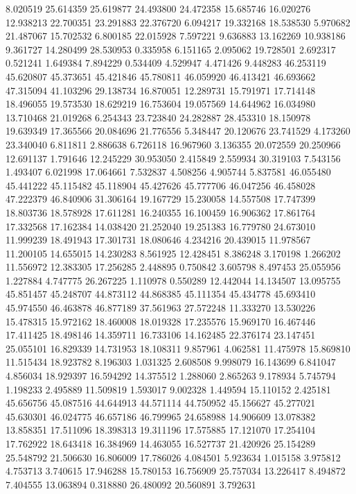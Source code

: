 8.020519
25.614359
25.619877
24.493800
24.472358
15.685746
16.020276
12.938213
22.700351
23.291883
22.376720
6.094217
19.332168
18.538530
5.970682
21.487067
15.702532
6.800185
22.015928
7.597221
9.636883
13.162269
10.938186
9.361727
14.280499
28.530953
0.335958
6.151165
2.095062
19.728501
2.692317
0.521241
1.649384
7.894229
0.534409
4.529947
4.471426
9.448283
46.253119
45.620807
45.373651
45.421846
45.780811
46.059920
46.413421
46.693662
47.315094
41.103296
29.138734
16.870051
12.289731
15.791971
17.714148
18.496055
19.573530
18.629219
16.753604
19.057569
14.644962
16.034980
13.710468
21.019268
6.254343
23.723840
24.282887
28.453310
18.150978
19.639349
17.365566
20.084696
21.776556
5.348447
20.120676
23.741529
4.173260
23.340040
6.811811
2.886638
6.726118
16.967960
3.136355
20.072559
20.250966
12.691137
1.791646
12.245229
30.953050
2.415849
2.559934
30.319103
7.543156
1.493407
6.021998
17.064661
7.532837
4.508256
4.905744
5.837581
46.055480
45.441222
45.115482
45.118904
45.427626
45.777706
46.047256
46.458028
47.222379
46.840906
31.306164
19.167729
15.230058
14.557508
17.747399
18.803736
18.578928
17.611281
16.240355
16.100459
16.906362
17.861764
17.332568
17.162384
14.038420
21.252040
19.251383
16.779780
24.673010
11.999239
18.491943
17.301731
18.080646
4.234216
20.439015
11.978567
11.200105
14.655015
14.230283
8.561925
12.428451
8.386248
3.170198
1.266202
11.556972
12.383305
17.256285
2.448895
0.750842
3.605798
8.497453
25.055956
1.227884
4.747775
26.267225
1.110978
0.550289
12.442044
14.134507
13.095755
45.851457
45.248707
44.873112
44.868385
45.111354
45.434778
45.693410
45.974550
46.463878
46.877189
37.561963
27.572248
11.333270
13.530226
15.478315
15.972162
18.460008
18.019328
17.235576
15.969170
16.467446
17.411425
18.498146
14.359711
16.733106
14.162485
22.376174
23.147451
25.055101
16.829339
14.731953
18.108311
9.857961
4.062581
11.475978
15.869810
11.515434
18.923782
8.196303
1.031325
2.608508
9.998079
16.143699
6.841047
4.856034
18.929397
16.594292
14.375512
1.288060
2.865263
9.178934
5.745794
1.198233
2.495889
11.509819
1.593017
9.002328
1.449594
15.110152
2.425181
45.656756
45.087516
44.644913
44.571114
44.750952
45.156627
45.277021
45.630301
46.024775
46.657186
46.799965
24.658988
14.906609
13.078382
13.858351
17.511096
18.398313
19.311196
17.575885
17.121070
17.254104
17.762922
18.643418
16.384969
14.463055
16.527737
21.420926
25.154289
25.548792
21.506630
16.806009
17.786026
4.084501
5.923634
1.015158
3.975812
4.753713
3.740615
17.946288
15.780153
16.756909
25.757034
13.226417
8.494872
7.404555
13.063894
0.318880
26.480092
20.560891
3.792631
